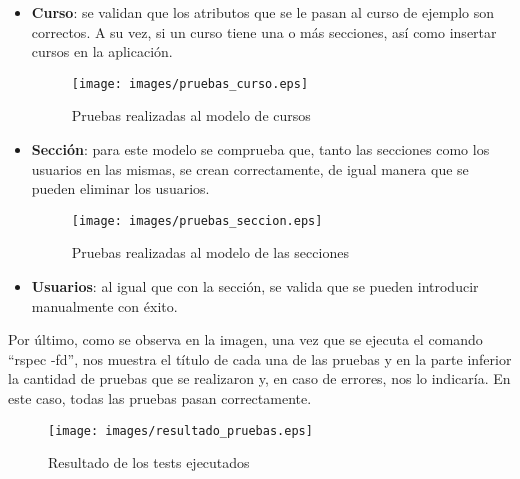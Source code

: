\begin{itemize}
    \item \textbf{Curso}: se validan que los atributos que se le pasan al curso de ejemplo son correctos. A su vez, si un curso tiene una o más secciones, así como insertar cursos en la aplicación.
    \begin{figure}[!th]
    \begin{center}
    \texttt{[image: images/pruebas\_curso.eps]}
    \caption{Pruebas realizadas al modelo de cursos}
    \label{fig:23}
    \end{center}
    \end{figure}
    
    \item \textbf{Sección}: para este modelo se comprueba que, tanto las secciones como los usuarios en las mismas, se crean correctamente, de igual manera que se pueden eliminar los usuarios.
    \begin{figure}[!th]
    \begin{center}
    \texttt{[image: images/pruebas\_seccion.eps]}
    \caption{Pruebas realizadas al modelo de las secciones}
    \label{fig:24}
    \end{center}
    \end{figure}
    \item \textbf{Usuarios}: al igual que con la sección, se valida que se pueden introducir manualmente con éxito.
\end{itemize}

\newpage
Por último, como se observa en la imagen, una vez que se ejecuta el comando ``rspec -fd'', nos muestra el título de cada una de las pruebas y en la parte inferior la cantidad de pruebas que se realizaron
y, en caso de errores, nos lo indicaría. En este caso, todas las pruebas pasan correctamente.

\begin{figure}[!th]
\begin{center}
\texttt{[image: images/resultado\_pruebas.eps]}
\caption{Resultado de los tests ejecutados}
\label{fig:25}
\end{center}
\end{figure}